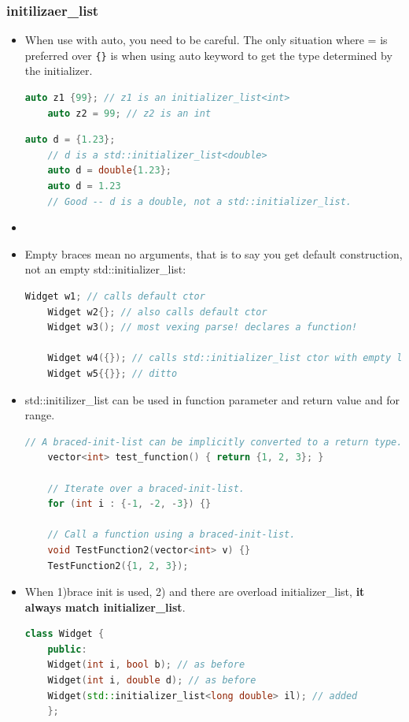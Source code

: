 \documentclass[a4paper,12pt,twoside]{book}
\begin{document}
\subsubsection{initilizaer\_list}
\begin{itemize}
	\item When use with auto, you need to be careful. The only situation where = is preferred over \verb={}= is when using auto keyword to get the type determined by the initializer.
	\begin{lstlisting}[frame=single, language=c++]
	auto z1 {99}; // z1 is an initializer_list<int>
	auto z2 = 99; // z2 is an int
	\end{lstlisting}
	
	\begin{lstlisting}[frame=single, language=c++]
	auto d = {1.23};
	// d is a std::initializer_list<double>
	auto d = double{1.23};
	auto d = 1.23
	// Good -- d is a double, not a std::initializer_list.
	\end{lstlisting}
	
	
	\item \item Empty braces mean no arguments, that is to say you get default construction, not an empty std::initializer\_list:
	\begin{lstlisting}[frame=single, language=c++,mathescape=true]
	Widget w1; // calls default ctor
	Widget w2{}; // also calls default ctor
	Widget w3(); // most vexing parse! declares a function!
	
	Widget w4({}); // calls std::initializer_list ctor with empty list
	Widget w5{{}}; // ditto
	\end{lstlisting}
	
	
	\item std::initilizer\_list can be used in function parameter and return value and for range.  
	\begin{lstlisting}[frame=single, language=c++,mathescape=true]
	// A braced-init-list can be implicitly converted to a return type.
	vector<int> test_function() { return {1, 2, 3}; }
	
	// Iterate over a braced-init-list.
	for (int i : {-1, -2, -3}) {}
	
	// Call a function using a braced-init-list.
	void TestFunction2(vector<int> v) {}
	TestFunction2({1, 2, 3}); 
	\end{lstlisting}
	
	
	\item When 1)brace init is used, 2) and there are overload initializer\_list, \textbf{it always match initializer\_list}.
	\begin{lstlisting}[frame=single, language=c++,mathescape=true]
	class Widget {
	public:
	Widget(int i, bool b); // as before
	Widget(int i, double d); // as before
	Widget(std::initializer_list<long double> il); // added
	};
	

\end{lstlisting}
\end{itemize}
\end{document}
